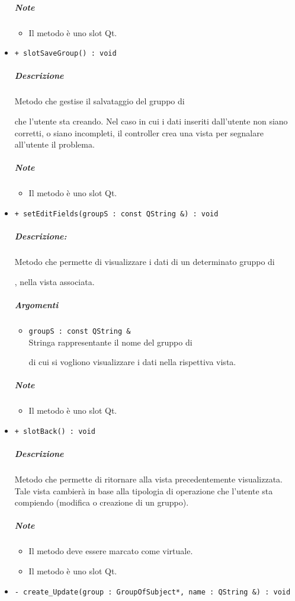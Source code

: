 \begin{itemize}
\begin{itemize}
			\end{itemize}
			\subparagraph{Note}
			\begin{itemize}
				\item Il metodo è uno slot\g{} Qt\g{}.
			\end{itemize}
			\item \color{blue} \verb!+ slotSaveGroup() : void!
			\color{black}
			\subparagraph{Descrizione} Metodo che gestise il salvataggio del gruppo di \subject{} che l'utente sta creando. Nel caso in cui i dati inseriti dall'utente non siano corretti, o siano incompleti, il controller crea una vista per segnalare all'utente il problema.
			\subparagraph{Note}
			\begin{itemize}
				\item Il metodo è uno slot\g{} Qt\g{}.
			\end{itemize}
			\item \color{blue} \verb!+ setEditFields(groupS : const QString &) : void!
			\color{black}
			\subparagraph{Descrizione:} Metodo che permette di visualizzare i dati di un determinato gruppo di \subject{}, nella vista associata.
			\color{black}
			\subparagraph{Argomenti}
			\begin{itemize}
				\item \color{RoyalPurple} \verb!groupS : const QString &!\\				
\color{black} Stringa rappresentante il nome del gruppo di \subject{} di cui si vogliono visualizzare i dati nella rispettiva vista.
			\end{itemize}
			\subparagraph{Note}
			\begin{itemize}
				\item Il metodo è uno slot\g{} Qt\g{}.
			\end{itemize}
			\item \color{blue} \verb!+ slotBack() : void!
			\color{black}
			\subparagraph{Descrizione} Metodo che permette di ritornare alla vista precedentemente visualizzata. Tale vista cambierà in base alla tipologia di operazione che l'utente sta compiendo (modifica o creazione di un gruppo).
			\subparagraph{Note}
			\begin{itemize}
				\item Il metodo deve essere marcato come virtuale.
				\item Il metodo è uno slot\g{} Qt\g{}.
			\end{itemize}
			\item \color{blue} \verb!- create_Update(group : GroupOfSubject*, name : QString &) : void!
			\color{black}

\end{itemize}
